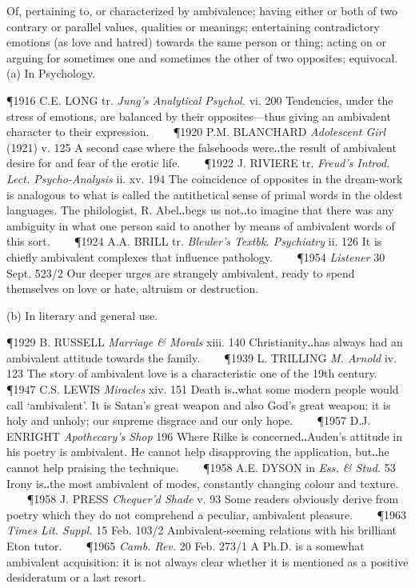\begin{description}[wide, labelwidth=!, labelindent=0pt]

\noindent  
Of, pertaining to, or characterized by ambivalence; having either or both of two contrary or parallel values, qualities or meanings; entertaining contradictory emotions (as love and hatred) towards the same person or thing; acting on or arguing for sometimes one and sometimes the other of two opposites; equivocal. (a) In Psychology. 

\P 1916 C.E. LONG tr. \textit{Jung's Analytical Psychol.} vi. 200 Tendencies, under the stress of emotions, are balanced by their opposites—thus giving an ambivalent character to their expression.    
\P 1920 P.M. BLANCHARD \textit{Adolescent Girl} (1921) v. 125 A second case where the falsehoods were‥the result of ambivalent desire for and fear of the erotic life.    
\P 1922 J. RIVIERE tr. \textit{Freud's Introd. Lect. Psycho-Analysis} ii. xv. 194 The coincidence of opposites in the dream-work is analogous to what is called the antithetical sense of primal words in the oldest languages. The philologist, R. Abel‥begs us not‥to imagine that there was any ambiguity in what one person said to another by means of ambivalent words of this sort.    
\P 1924 A.A. BRILL tr. \textit{Bleuler's Textbk. Psychiatry} ii. 126 It is chiefly ambivalent complexes that influence pathology.    
\P 1954 \textit{Listener} 30 Sept. 523/2 Our deeper urges are strangely ambivalent, ready to spend themselves on love or hate, altruism or destruction.

\noindent (b) In literary and general use. 

\P 1929 B. RUSSELL \textit{Marriage \& Morals} xiii. 140 Christianity‥has always had an ambivalent attitude towards the family.    
\P 1939 L. TRILLING \textit{M. Arnold} iv. 123 The story of ambivalent love is a characteristic one of the 19th century.    
\P 1947 C.S. LEWIS \textit{Miracles} xiv. 151 Death is‥what some modern people would call ‘ambivalent’. It is Satan's great weapon and also God's great weapon; it is holy and unholy; our supreme disgrace and our only hope.    
\P 1957 D.J. ENRIGHT \textit{Apothecary's Shop} 196 Where Rilke is concerned‥Auden's attitude in his poetry is ambivalent. He cannot help disapproving the application, but‥he cannot help praising the technique.    
\P 1958 A.E. DYSON in \textit{Ess. \& Stud.} 53 Irony is‥the most ambivalent of modes, constantly changing colour and texture.    
\P 1958 J. PRESS \textit{Chequer'd Shade} v. 93 Some readers obviously derive from poetry which they do not comprehend a peculiar, ambivalent pleasure.    
\P 1963 \textit{Times Lit. Suppl.} 15 Feb. 103/2 Ambivalent-seeming relations with his brilliant Eton tutor.    
\P 1965 \textit{Camb. Rev.} 20 Feb. 273/1 A Ph.D. is a somewhat ambivalent acquisition: it is not always clear whether it is mentioned as a positive desideratum or a last resort.


\end{description}
